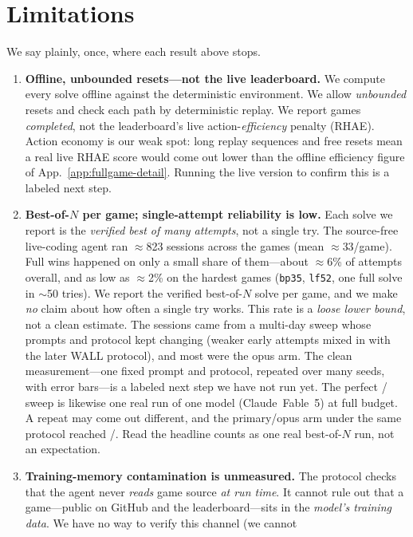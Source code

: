 \documentclass[11pt]{article}
\begin{document}
\section{Limitations}
\label{sec:limitations}
We say plainly, once, where each result above stops.
\begin{enumerate}\setlength{\itemsep}{2pt}
\item \textbf{Offline, unbounded resets---not the live leaderboard.} We compute every solve offline
against the deterministic environment. We allow \emph{unbounded} resets and check each path by
deterministic replay. We report games \emph{completed}, not the leaderboard's live
action-\emph{efficiency} penalty (RHAE). Action economy is our weak spot: long replay sequences and free
resets mean a real live RHAE score would come out lower than the offline efficiency figure of
App.~\ref{app:fullgame-detail}. Running the live version to confirm this is a labeled next step.
\item \textbf{Best-of-$N$ per game; single-attempt reliability is low.} Each solve we report is the
\emph{verified best of many attempts}, not a single try. The source-free live-coding agent ran
$\approx$823 sessions across the \ArcUnionGames{} games (mean $\approx$33/game). Full wins happened on
only a small share of them---about $\approx$6\% of attempts overall, and as low as $\approx$2\% on the
hardest games (\texttt{bp35}, \texttt{lf52}, one full solve in $\sim$50 tries). We report the verified
best-of-$N$ solve per game, and we make \emph{no} claim about how often a single try works. This rate is
a \emph{loose lower bound}, not a clean estimate. The sessions came from a multi-day sweep whose prompts
and protocol kept changing (weaker early attempts mixed in with the later WALL protocol), and most were
the opus arm. The clean measurement---one fixed prompt and protocol, repeated over many seeds, with error
bars---is a labeled next step we have not run yet. The perfect \ArcFableFull/\ArcUnionGames{} sweep is
likewise one real run of one model (Claude~Fable~5) at full budget. A repeat may come out different, and
the primary/opus arm under the same protocol reached \ArcSFGames/\ArcUnionGames{}. Read the headline
counts as one real best-of-$N$ run, not an expectation.
\item \textbf{Training-memory contamination is unmeasured.} The protocol checks that the agent never
\emph{reads} game source \emph{at run time}. It cannot rule out that a game---public on GitHub and the
leaderboard---sits in the \emph{model's training data}. We have no way to verify this channel (we cannot

\end{enumerate}
\end{document}
